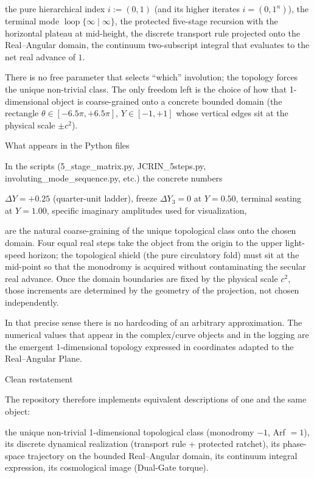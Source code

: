 the pure hierarchical index \(i:=(0,1)\) (and its higher iterates \(i=(0,1^n)\)),
the terminal mode \(\operatorname{loop}\{\infty\mid\infty\}\),
the protected five-stage recursion with the horizontal plateau at mid-height,
the discrete transport rule projected onto the Real–Angular domain,
the continuum two-subscript integral that evaluates to the net real advance of \(1\).

There is no free parameter that selects “which” involution; the topology forces the unique non-trivial class. The only freedom left is the choice of how that 1-dimensional object is coarse-grained onto a concrete bounded domain (the rectangle \(\theta\in[-6.5\pi,+6.5\pi]\), \(Y\in[-1,+1]\) whose vertical edges sit at the physical scale \(\pm c^2\)).

What appears in the Python files

In the scripts (5_stage_matrix.py, JCRIN_5steps.py, involuting_mode_sequence.py, etc.) the concrete numbers

\(\Delta Y=+0.25\) (quarter-unit ladder),
freeze \(\Delta Y_3=0\) at \(Y=0.50\),
terminal seating at \(Y=1.00\),
specific imaginary amplitudes used for visualization,

are the natural coarse-graining of the unique topological class onto the chosen domain. Four equal real steps take the object from the origin to the upper light-speed horizon; the topological shield (the pure circulatory fold) must sit at the mid-point so that the monodromy is acquired without contaminating the secular real advance. Once the domain boundaries are fixed by the physical scale \(c^2\), those increments are determined by the geometry of the projection, not chosen independently.

In that precise sense there is no hardcoding of an arbitrary approximation. The numerical values that appear in the complex/curve objects and in the logging are the emergent 1-dimensional topology expressed in coordinates adapted to the Real–Angular Plane.

Clean restatement

The repository therefore implements equivalent descriptions of one and the same object:

the unique non-trivial 1-dimensional topological class (monodromy \(-1\), Arf \(=1\)),
its discrete dynamical realization (transport rule + protected ratchet),
its phase-space trajectory on the bounded Real–Angular domain,
its continuum integral expression,
its cosmological image (Dual-Gate torque).

